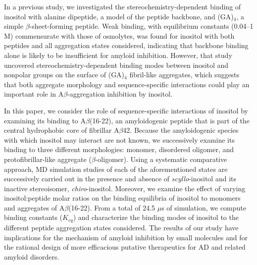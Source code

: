 In a previous study,\cite{Li:2012p853} we investigated the stereochemistry-dependent binding of inositol with alanine dipeptide, a model of the peptide backbone, and (GA)$_4$, a simple $\beta$-sheet-forming peptide. Weak binding, with equilibrium constants (0.04--1 M) commensurate with those of osmolytes, was found for inositol with both peptides and all aggregation states considered, indicating that backbone binding alone is likely to be insufficient for amyloid inhibition. However, that study uncovered stereochemistry-dependent binding modes between inositol and nonpolar groups on the surface of (GA)$_4$ fibril-like aggregates, which suggests that both aggregate morphology and sequence-specific interactions could play an important role in A$\beta$-aggregation inhibition by inositol.  

In this paper, we consider the role of sequence-specific interactions of inositol by examining its binding to A$\beta$(16-22), an amyloidogenic peptide that is part of the central hydrophobic core of fibrillar A$\beta$42.  Because the amyloidogenic species with which inositol may interact are not known, we successively examine its binding to three different morphologies: monomer, disordered oligomer, and protofibrillar-like aggregate ($\beta$-oligomer).  Using a systematic comparative approach, MD simulation studies of each of the aforementioned states are successively carried out in the presence and absence of \emph{scyllo}-inositol and its inactive stereoisomer, \emph{chiro}-inositol.  Moreover, we examine the effect of varying inositol:peptide molar ratios on the binding equilibria of inositol to monomers and aggregates of A$\beta$(16-22). From a total of 24.5 $\mu$s of simulation, we compute binding constants ($K_{eq}$) and characterize the binding modes of inositol to the different peptide aggregation states considered. The results of our study have implications for the mechanism of amyloid inhibition by small molecules and for the rational design of more efficacious putative therapeutics for AD and related amyloid disorders.

